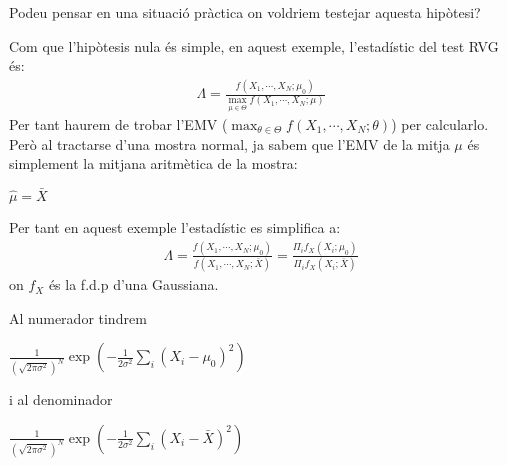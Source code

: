 \documentclass[letterpaper,10pt,english]{sphinxmanual}
\begin{document}
Podeu pensar en una situació pràctica on voldriem testejar aquesta hipòtesi?

Com que l’hipòtesis nula és simple, en aquest exemple, l’estadístic del test RVG és:
\begin{equation*}
\begin{split}\Lambda = \frac{f(X_1, \cdots, X_N; \mu_0)}{\max_{\mu \in \Theta} f(X_1, \cdots, X_N; \mu)}\end{split}
\end{equation*}
Per tant haurem de trobar l’EMV (\(\max_{\theta \in \Theta} f(X_1, \cdots, X_N; \theta)\))
per calcular\sphinxhyphen{}lo. Però al tractar\sphinxhyphen{}se d’una mostra normal, ja sabem que l’EMV
de la mitja \(\mu\) és simplement la mitjana aritmètica de la mostra:

\(\hat{\mu} = \bar{X}\)

Per tant en aquest exemple l’estadístic es simplifica a:
\begin{equation*}
\begin{split}\Lambda = \frac{f(X_1, \cdots, X_N; \mu_0)}{f(X_1, \cdots, X_N; \bar{X})} = \frac{\Pi_i f_X(X_i; \mu_0)}{\Pi_i f_X(X_i; \bar{X})}\end{split}
\end{equation*}
on \(f_X\) és la f.d.p d’una Gaussiana.

Al numerador tindrem

\(\frac{1}{\left(\sqrt{2\pi\sigma^2}\right)^N}\exp\left(-\frac{1}{2\sigma^2}\sum_i(X_i - \mu_0)^2 \right)\)

i al denominador

\(\frac{1}{\left(\sqrt{2\pi\sigma^2}\right)^N}\exp\left(-\frac{1}{2\sigma^2}\sum_i(X_i - \bar{X})^2 \right)\)
\end{document}
